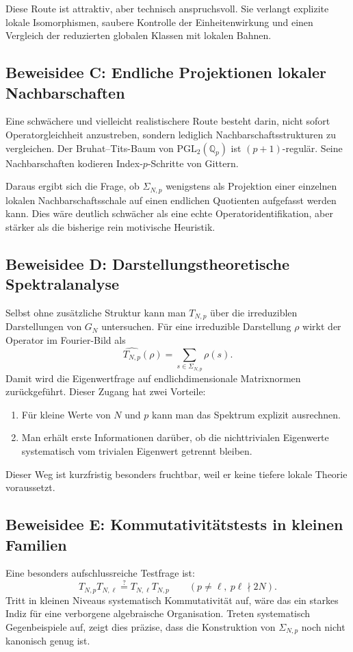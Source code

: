 \documentclass[12pt,a4paper]{article}
\theoremstyle{plain}
\theoremstyle{definition}
\theoremstyle{remark}
\newcommand{\Q}{\mathbb{Q}}
\begin{document}
	Diese Route ist attraktiv, aber technisch anspruchsvoll. Sie verlangt explizite lokale Isomorphismen, saubere Kontrolle der Einheitenwirkung und einen Vergleich der reduzierten globalen Klassen mit lokalen Bahnen.
	
	\subsection{Beweisidee C: Endliche Projektionen lokaler Nachbarschaften}
	Eine schwächere und vielleicht realistischere Route besteht darin, nicht sofort Operatorgleichheit anzustreben, sondern lediglich Nachbarschaftsstrukturen zu vergleichen. Der Bruhat--Tits-Baum von $\mathrm{PGL}_2(\Q_p)$ ist $(p+1)$-regulär. Seine Nachbarschaften kodieren Index-$p$-Schritte von Gittern.
	
	Daraus ergibt sich die Frage, ob $\Sigma_{N,p}$ wenigstens als Projektion einer einzelnen lokalen Nachbarschaftsschale auf einen endlichen Quotienten aufgefasst werden kann. Dies wäre deutlich schwächer als eine echte Operatoridentifikation, aber stärker als die bisherige rein motivische Heuristik.
	
	\subsection{Beweisidee D: Darstellungstheoretische Spektralanalyse}
	Selbst ohne zusätzliche Struktur kann man $T_{N,p}$ über die irreduziblen Darstellungen von $G_N$ untersuchen. Für eine irreduzible Darstellung $\rho$ wirkt der Operator im Fourier-Bild als
	\[
	\widehat{T_{N,p}}(\rho)=\sum_{s\in\Sigma_{N,p}}\rho(s).
	\]
	Damit wird die Eigenwertfrage auf endlichdimensionale Matrixnormen zurückgeführt. Dieser Zugang hat zwei Vorteile:
	\begin{enumerate}[label=(\alph*)]
		\item Für kleine Werte von $N$ und $p$ kann man das Spektrum explizit ausrechnen.
		\item Man erhält erste Informationen darüber, ob die nichttrivialen Eigenwerte systematisch vom trivialen Eigenwert getrennt bleiben.
	\end{enumerate}
	
	Dieser Weg ist kurzfristig besonders fruchtbar, weil er keine tiefere lokale Theorie voraussetzt.
	
	\subsection{Beweisidee E: Kommutativitätstests in kleinen Familien}
	Eine besonders aufschlussreiche Testfrage ist:
	\[
	T_{N,p}T_{N,\ell}\stackrel{?}{=}T_{N,\ell}T_{N,p}
	\qquad (p\neq \ell,\ p\ell\nmid 2N).
	\]
	Tritt in kleinen Niveaus systematisch Kommutativität auf, wäre das ein starkes Indiz für eine verborgene algebraische Organisation. Treten systematisch Gegenbeispiele auf, zeigt dies präzise, dass die Konstruktion von $\Sigma_{N,p}$ noch nicht kanonisch genug ist.
	
\end{document}

